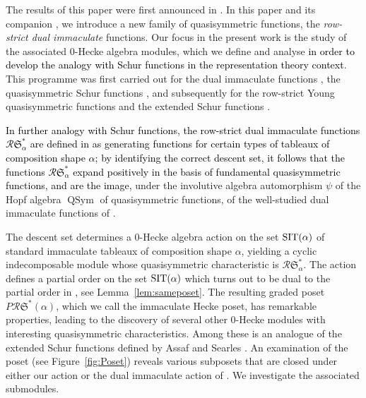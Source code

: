 \documentclass[12pt,letterpaper]{amsart}
\newcommand{\svw}{\textcolor{black}}
\theoremstyle{definition}
\newcommand{\rdI}{\mathcal{R}\mathfrak{S}^*}
\newcommand{\Qsym}{\ensuremath{\operatorname{QSym}}}
\begin{document}
The results of this paper were  first announced in \cite{NSvWVW2022FPSAC}. 
In this paper and its companion \cite{NSvWVW2023}, we introduce a new family of quasisymmetric functions, the \emph{row-strict dual immaculate} functions.  Our focus in the present work is the study of the associated 0-Hecke algebra modules, which we define and analyse \svw{in order to develop the analogy with Schur functions in the representation theory context}. This programme was first carried out for the dual immaculate functions \cite{BBSSZ2015}, the quasisymmetric Schur functions \cite{TvW2015}, and subsequently for the row-strict Young quasisymmetric functions \cite{BS2021} and the extended Schur functions \cite{S2020}.

\svw{In further analogy with Schur functions, the row-strict dual immaculate functions $\rdI_\alpha$ are  defined in  \cite{NSvWVW2023} as generating functions for certain types of tableaux of composition shape $\alpha$; by identifying the correct descent set, it follows that the functions 
$\rdI_\alpha$ expand positively in the basis of fundamental quasisymmetric functions, and are the image,} under the involutive algebra automorphism $\psi$ of the Hopf algebra $\Qsym$ of quasisymmetric functions, of the well-studied dual immaculate functions of \cite{BBSSZ2015}.

The descent set  determines a 0-Hecke algebra action on the set $\operatorname{SIT}(\alpha)$ of standard immaculate tableaux of composition shape $\alpha$, yielding a cyclic indecomposable module whose quasisymmetric characteristic is $\rdI_\alpha$.  The action defines a partial order on the set $\operatorname{SIT}(\alpha)$ which turns out to be dual to the partial order in \cite{BBSSZ2015}, see Lemma~\ref{lem:sameposet}.  The resulting graded poset $P\rdI(\alpha)$, which we call the immaculate Hecke poset,  has remarkable properties, leading to the discovery of several other 0-Hecke modules with interesting quasisymmetric characteristics.  Among these is an analogue of the extended Schur functions defined by Assaf and Searles \cite{AS2019}. An examination of the poset (see Figure~\ref{fig:Poset}) reveals various subposets that are closed under either our action or the dual immaculate action of \cite{BBSSZ2015}.  We  investigate the associated submodules.
\end{document}
